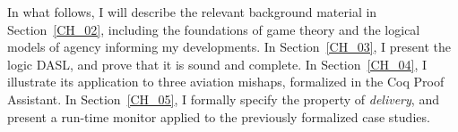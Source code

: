  

In what follows, I will describe the relevant background material in Section~\ref{CH_02}, including the foundations of game theory and the logical models of agency informing my developments. In Section~\ref{CH_03}, I present the logic DASL, and prove that it is sound and complete. In Section~\ref{CH_04}, I illustrate its application to three aviation mishaps, formalized in the Coq Proof Assistant. In Section~\ref{CH_05}, I formally specify the property of \emph{delivery}, and present a run-time monitor applied to the previously formalized case studies.
